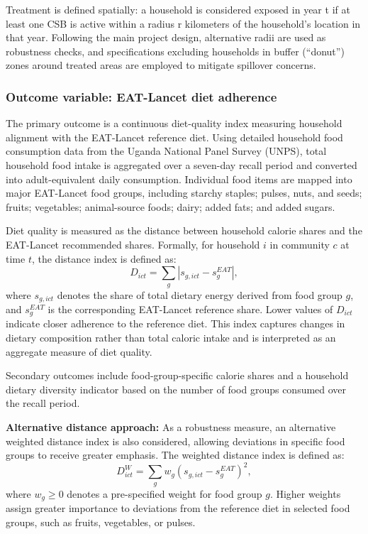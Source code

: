 \documentclass{article}
\begin{document}
Treatment is defined spatially: a household is considered exposed in year t if at least one CSB is active within a radius r kilometers of the household’s location in that year. Following the main project design, alternative radii are used as robustness checks, and specifications excluding households in buffer (“donut”) zones around treated areas are employed to mitigate spillover concerns. 

\subsubsection{Outcome variable: EAT-Lancet diet adherence}

The primary outcome is a continuous diet-quality index measuring household alignment with the EAT-Lancet reference diet. Using detailed household food consumption data from the Uganda National Panel Survey (UNPS), total household food intake is aggregated over a seven-day recall period and converted into adult-equivalent daily consumption. Individual food items are mapped into major EAT-Lancet food groups, including starchy staples; pulses, nuts, and seeds; fruits; vegetables; animal-source foods; dairy; added fats; and added sugars.

Diet quality is measured as the distance between household calorie shares and the EAT-Lancet recommended shares. Formally, for household $i$ in community $c$ at time $t$, the distance index is defined as:
\[
D_{ict} = \sum_{g} \left| s_{g,ict} - s_{g}^{EAT} \right|,
\]
where $s_{g,ict}$ denotes the share of total dietary energy derived from food group $g$, and $s_{g}^{EAT}$ is the corresponding EAT-Lancet reference share. Lower values of $D_{ict}$ indicate closer adherence to the reference diet. This index captures changes in dietary composition rather than total caloric intake and is interpreted as an aggregate measure of diet quality.

Secondary outcomes include food-group-specific calorie shares and a household dietary diversity indicator based on the number of food groups consumed over the recall period.\vspace{1\baselineskip}

\textbf{Alternative distance approach:} As a robustness measure, an alternative weighted distance index is also considered, allowing deviations in specific food groups to receive greater emphasis. The weighted distance index is defined as:
\[
D^{W}_{ict} = \sum_{g} w_g \left( s_{g,ict} - s_{g}^{EAT} \right)^2,
\]
where $w_g \geq 0$ denotes a pre-specified weight for food group $g$. Higher weights assign greater importance to deviations from the reference diet in selected food groups, such as fruits, vegetables, or pulses.
\end{document}
